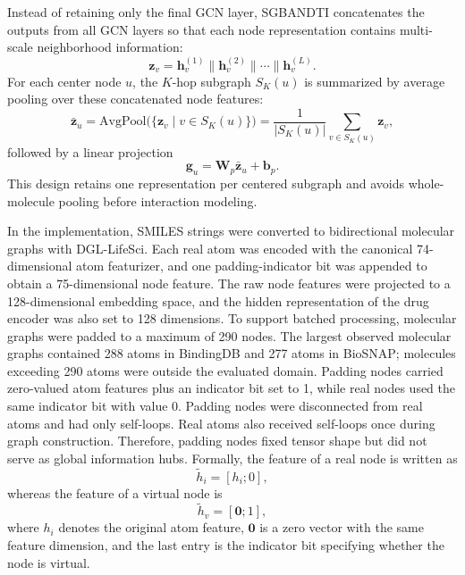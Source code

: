 \documentclass[computers,article,submit,moreauthors]{Definitions/mdpi}
\begin{document}
Instead of retaining only the final GCN layer, SGBANDTI concatenates the outputs from all GCN layers so that each node representation contains multi-scale neighborhood information:
\begin{equation}
\mathbf{z}_v = \mathbf{h}_v^{(1)} \mathbin{\|} \mathbf{h}_v^{(2)} \mathbin{\|} \cdots \mathbin{\|} \mathbf{h}_v^{(L)}.
\end{equation}
For each center node $u$, the $K$-hop subgraph $S_K(u)$ is summarized by average pooling over these concatenated node features:
\begin{equation}
\bar{\mathbf{z}}_u = \mathrm{AvgPool}\big(\{\mathbf{z}_v \mid v \in S_K(u)\}\big) = \frac{1}{|S_K(u)|}\sum_{v \in S_K(u)} \mathbf{z}_v,
\end{equation}
followed by a linear projection
\begin{equation}
\mathbf{g}_u = \mathbf{W}_p \bar{\mathbf{z}}_u + \mathbf{b}_p.
\end{equation}
This design retains one representation per centered subgraph and avoids whole-molecule pooling before interaction modeling.

In the implementation, SMILES strings were converted to bidirectional molecular graphs with DGL-LifeSci. Each real atom was encoded with the canonical 74-dimensional atom featurizer, and one padding-indicator bit was appended to obtain a 75-dimensional node feature. The raw node features were projected to a 128-dimensional embedding space, and the hidden representation of the drug encoder was also set to 128 dimensions. To support batched processing, molecular graphs were padded to a maximum of 290 nodes. The largest observed molecular graphs contained 288 atoms in BindingDB and 277 atoms in BioSNAP; molecules exceeding 290 atoms were outside the evaluated domain. Padding nodes carried zero-valued atom features plus an indicator bit set to 1, while real nodes used the same indicator bit with value 0. Padding nodes were disconnected from real atoms and had only self-loops. Real atoms also received self-loops once during graph construction. Therefore, padding nodes fixed tensor shape but did not serve as global information hubs. Formally, the feature of a real node is written as
\begin{equation}
\tilde{h}_i = [h_i; 0],
\end{equation}
whereas the feature of a virtual node is
\begin{equation}
\tilde{h}_v = [\mathbf{0}; 1],
\end{equation}
where $h_i$ denotes the original atom feature, $\mathbf{0}$ is a zero vector with the same feature dimension, and the last entry is the indicator bit specifying whether the node is virtual.
\end{document}
